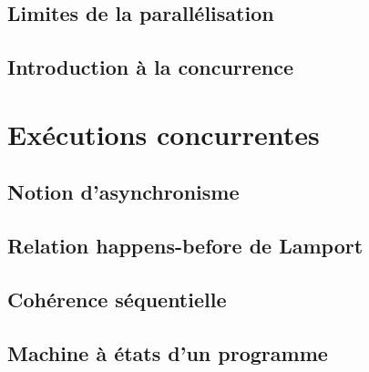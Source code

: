 \documentclass[9pt, handout]{beamer}
\begin{document}
\subsection{Limites de la parallélisation}




 
\subsection{Introduction à la concurrence}





 
\section{Exécutions concurrentes}
 
\subsection{Notion d'asynchronisme}


 
\subsection{Relation happens-before de Lamport}



 
\subsection{Cohérence séquentielle}


 
\subsection{Machine à états d'un programme}



 
\end{document}
